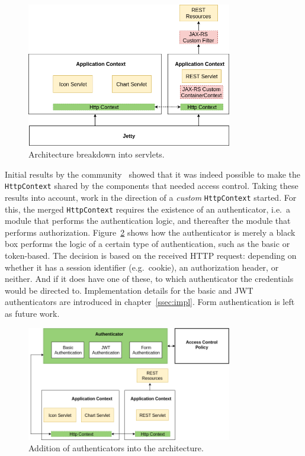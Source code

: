 \documentclass[12pt]{article}
\begin{document}
\begin{figure} [ht] 
\begin{center}
\includegraphics[width=0.8\textwidth]{esh_auth_arch}
\caption{Architecture breakdown into servlets.}
\label{fig:esh_auth_arch}
\end{center}
\end{figure}

Initial results by the community~\cite{esh_03} showed that it was indeed possible to make the \texttt{HttpContext} shared by the components that needed access control. Taking these results into account, work in the direction of a \emph{custom} \texttt{HttpContext} started. For this, the merged \texttt{HttpContext} requires the existence of an authenticator, i.e.\ a module that performs the authentication logic, and thereafter the module that performs authorization. Figure~\ref{fig:esh_arch_authenticator} shows how the authenticator is merely a black box performs the logic of a certain type of authentication, such as the basic or token-based. The decision is based on the received HTTP request: depending on whether it has a session identifier (e.g.\ cookie), an authorization header, or neither. And if it does have one of these, to which authenticator the credentials would be directed to. Implementation details for the basic and JWT authenticators are introduced in chapter~\ref{ssec:impl}. Form authentication is left as future work. 

\begin{figure} [ht] 
\begin{center}
\includegraphics[width=0.8\textwidth]{esh_arch_authenticator}
\caption{Addition of authenticators into the architecture.}
\label{fig:esh_arch_authenticator}
\end{center}
\end{figure}
\end{document}
